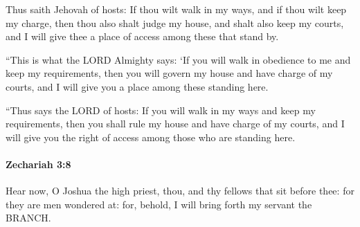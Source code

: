 			\begin{versebox}
					\item[BHS] 
					\item[LXX] 
					\item[ASV] Thus saith Jehovah of hosts: If thou wilt walk in my ways, and if thou wilt keep my charge, then thou also shalt judge my house, and shalt also keep my courts, and I will give thee a place of access among these that stand by.
					\item[NIV] “This is what the LORD Almighty says: ‘If you will walk in obedience to me and keep my requirements, then you will govern my house and have charge of my courts, and I will give you a place among these standing here.
					\item[NRSV] “Thus says the LORD of hosts: If you will walk in my ways and keep my requirements, then you shall rule my house and have charge of my courts, and I will give you the right of access among those who are standing here.
			\end{versebox}

		\paragraph{Zechariah 3:8} %
			\label{ZECHARIAH-3-8}

			Hear now, O Joshua the high priest, thou, and thy fellows that sit before thee: for they are men wondered at: for, behold, I will bring forth my servant the BRANCH.

